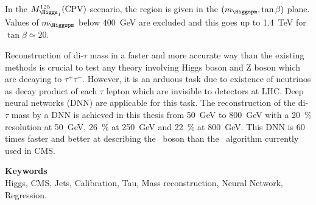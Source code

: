 In the $M_{\Higgs_1}^{125}(\text{CPV})$ scenario,
the region is given in the $(m_{\Higgspm},\tan\beta)$ plane.
Values of $m_{\Higgspm}$ below \SI{400}{\GeV} are excluded
and this goes up to 
\SI{1.4}{\TeV} for $\tan\beta\simeq\num{20}$.
\par
Reconstruction of di-$\tau$ mass in a faster and more accurate way than the existing methods is crucial to test any theory involving Higgs boson and Z boson which are decaying to $\tau^+ \tau^-$. 
However, it is an arduous task due to existence of neutrinos as decay product of each $\tau$ lepton which are invisible to detectors at LHC. 
Deep neural networks (DNN) are applicable for this task. 
The reconstruction of the di-$\tau$ mass by a DNN
is achieved in this thesis
from 
\SI{50}{\GeV} to \SI{800}{\GeV}
with a
\SI{20}{\%} resolution at \SI{50}{\GeV},
\SI{26}{\%} at \SI{250}{\GeV} and
\SI{22}{\%} at \SI{800}{\GeV}.
This DNN is
60 times faster
and
better at describing the \Zboson~boson
than the \SVFIT\ algorithm currently used in CMS.

\vfill

\noindent\textbf{\Large\sffamily Keywords}\\
Higgs,
CMS,
Jets,
Calibration,
Tau,
Mass reconstruction,
Neural Network,
Regression.

\vspace{2\baselineskip}